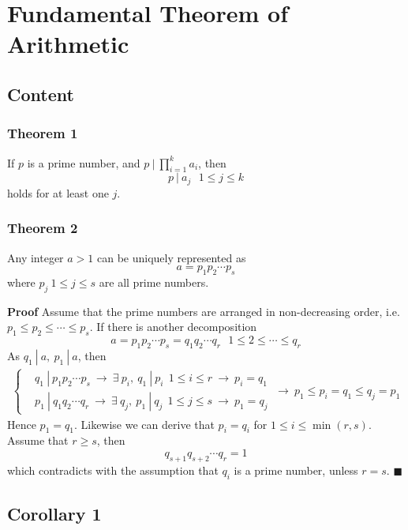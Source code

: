 \documentclass[11pt]{article}
\begin{document}
\section{Fundamental Theorem of Arithmetic}
\subsection{Content}
\subsubsection{Theorem 1}
If $p$ is a prime number, and $p~|~\prod_{i=1}^ka_i$, then
\begin{equation}
    p~|~a_j~~~1\leq j \leq k
\end{equation}
holds for at least one $j$.
\subsubsection{Theorem 2}
Any integer $a > 1$ can be uniquely represented as
\begin{equation}
    a = p_1p_2\cdots p_s
\end{equation}
where $p_j~1\leq j \leq s$ are all prime numbers. \par \noindent \textbf{Proof} Assume that the prime numbers are arranged in non-decreasing order, i.e. $p_1 \leq p_2 \leq \cdots \leq p_s$. If there is another decomposition
\begin{equation}
    a = p_1p_2\cdots p_s = q_1q_2 \cdots q_r~~~1\leq 2\leq \cdots \leq q_r
\end{equation}
As $q_1~|~a,~p_1~|~a$, then
\begin{gather}
\left\{
\begin{aligned}
    &q_1~|~p_1p_2\cdots p_s~\rightarrow~\exists~p_i,~q_1~|~p_i~~1 \leq i \leq r~\rightarrow~p_i = q_1\\
    &p_1~|~q_1q_2\cdots q_r~\rightarrow~\exists~q_j,~p_1~|~q_j~~1 \leq j \leq s~\rightarrow~p_1=q_j
\end{aligned}
\right. ~\longrightarrow~p_1 \leq p_i = q_1 \leq q_j = p_1
\end{gather}
Hence $p_1=q_1$. Likewise we can derive that $p_i = q_i$ for $1 \leq i \leq \min(r,s)$. Assume that $r \geq s$, then
\begin{equation}
    q_{s+1}q_{s+2}\cdots q_r = 1
\end{equation}
which contradicts with the assumption that $q_i$ is a prime number, unless $r =s$. \hfill $\blacksquare$ \subsection{Corollary 1}
\end{document}
